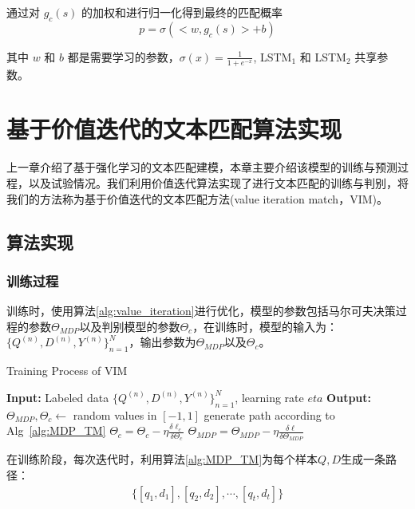 通过对 $g_c(s)$ 的加权和进行归一化得到最终的匹配概率
\begin{equation}
\label{eq:TM_classfiy}
p = \sigma(<w, g_c(s)> + b)
\end{equation}

其中 $w$ 和 $b$ 都是需要学习的参数，$\sigma(x) = \frac{1}{1+e^{-x}}$, LSTM$_1$  和 LSTM$_2$ 共享参数。


\chapter{基于价值迭代的文本匹配算法实现}
上一章介绍了基于强化学习的文本匹配建模，本章主要介绍该模型的训练与预测过程，以及试验情况。我们利用价值迭代算法实现了进行文本匹配的训练与判别，将我们的方法称为基于价值迭代的文本匹配方法(value iteration match，VIM)。
\section{算法实现}

\subsection{训练过程}

训练时，使用算法\ref{alg:value_iteration}进行优化，模型的参数包括马尔可夫决策过程的参数$\Theta_{MDP}$以及判别模型的参数$\Theta_c$，在训练时，模型的输入为：$\{Q^{(n)}, D^{(n)}, Y^{(n)}\}_{n=1}^N$，输出参数为$\Theta_{MDP}$以及$\Theta_c$。

\begin{algorithm}[!htbp]
	\small
	\caption{Training Process of VIM}
	\label{alg:VIM_train}
	\begin{algorithmic}
		\STATE \textbf{Input:} Labeled data $\{Q^{(n)}, D^{(n)}, Y^{(n)}\}_{n=1}^N$, learning rate $eta$
		\STATE \textbf{Output:} $\Theta_{MDP}, \Theta_{c} \leftarrow$ random values in $[-1, 1]$
			\STATE generate path according to Alg~\ref{alg:MDP_TM}
				\STATE $\Theta_{c} = \Theta_{c} - \eta \frac{\delta \ell_c}{\delta \Theta_{c}}$ 
			\ENDWHILE
			\STATE $\Theta_{MDP} = \Theta_{MDP} - \eta \frac{\delta \ell}{\delta \Theta_{MDP}}$ 
			\ENDWHILE
	\end{algorithmic}
\end{algorithm}

在训练阶段，每次迭代时，利用算法\ref{alg:MDP_TM}为每个样本$Q, D$生成一条路径：
\begin{equation}\label{eq:mdp_path}
	\begin{aligned}
		\{[q_1, d_1], [q_2, d_2], \cdots, [q_t, d_t]\}
	\end{aligned}
\end{equation}

